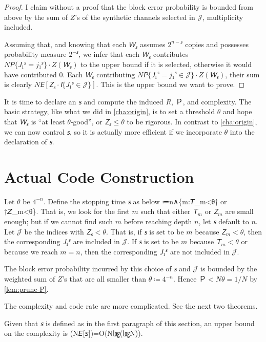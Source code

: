 \documentclass[openany]{amsbook}
\numberwithin{equation}{chapter}
\numberwithin{figure}{chapter}
\numberwithin{table}{chapter}
\def\[#1\]{\begin{equation*}{#1}\end{equation*}}
\theoremstyle{definition}	理dfn:Definition~?s			理exa:Example~?s
\theoremstyle{remark}		理cla:Claim~?s				理rem:Remark~?s
\begin{document}
	\begin{proof}
		I claim without a proof that the block error probability
		is bounded from above by the sum of $Z$'s of
		the synthetic channels selected in $𝒥$, multiplicity included.
		
		Assuming that, and knowing that each $𝘞_𝘴$ assumes $2^{n-𝘴}$ copies
		and possesses probability measure $2^{-𝘴}$, we infer that
		each $𝘞_𝘴$ contributes $N𝘗\{𝘑₁^𝘴=j₁^𝘴\}·Z(𝘞_𝘴)$ to the upper bound
		if it is selected, otherwise it would have contributed $0$.
		Each $𝘞_𝘴$ contributing $N𝘗\{𝘑₁^𝘴=j₁^𝘴∈𝒥\}·Z(𝘞_𝘴)$,
		their sum is clearly $N𝘌[𝘡_𝘴·𝘐\{𝘑₁^𝘴∈𝒥\}]$.
		This is the upper bound we want to prove.
	\end{proof}

	It is time to declare an $𝘴$ and compute the induced $R$, $Ｐ$, and complexity.
	The basic strategy, like what we did in \cref{cha:origin}, is to set a threshold $θ$
	and hope that $𝘞_𝘴$ is “at least $θ$-good”, or $𝘡_𝘴≤θ$ to be rigorous.
	In contrast to \cref{cha:origin}, we can now control $𝘴$,
	so it is actually more efficient if we incorporate $θ$ into the declaration of $𝘴$.

\section{Actual Code Construction}

	Let $θ$ be $4^{-n}$.
	Define the stopping time $𝘴$ as below
	\[𝘴≔n∧\min\{m:𝘛_m<θ† or †𝘡_m<θ\}.\label{for:stop}\]
	That is, we look for the first $m$ such that either $𝘛_m$ or $𝘡_m$ are small enough;
	but if we cannot find such $m$ before reaching depth $n$, let $𝘴$ default to $n$.
	Let $𝒥$ be the indices with $𝘡_𝘴<θ$.
	That is, if $𝘴$ is set to be $m$ because $𝘡_m<θ$,
	then the corresponding $𝘑₁^𝘴$ are included in $𝒥$.
	If $𝘴$ is set to be $m$ because $𝘛_m<θ$ or because we reach $m=n$,
	then the corresponding $𝘑₁^𝘴$ are not included in $𝒥$.
	
	The block error probability incurred by this choice of $𝘴$ and $𝒥$
	is bounded by the weighted sum of $Z$'s that are all smaller than $θ≔4^{-n}$.
	Hence $Ｐ<Nθ=1/N$ by \cref{lem:prune-P}.
	
	The complexity and code rate are more complicated.
	See the next two theorems.
	
	\begin{thm}\label{thm:actual-C}
		Given that $𝘴$ is defined as in the first paragraph of this section,
		an upper bound on the complexity is
		\[O(N𝘌[𝘴])=O(N㏒(㏒N)).\]
	\end{thm}
	
\end{document}

